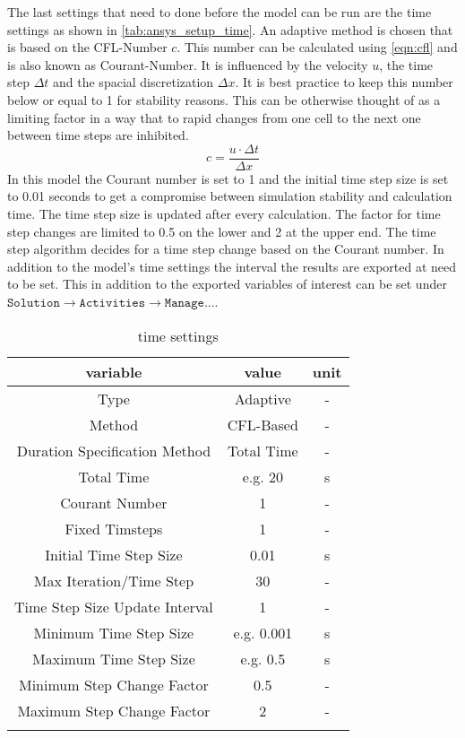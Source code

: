 \documentclass[../thesis.tex]{subfiles}
\begin{document}
The last settings that need to done before the model can be run are the time settings as shown in \autoref{tab:ansys_setup_time}. An adaptive method is chosen that is based on the CFL-Number $c$. This number can be calculated using \autoref{eqn:cfl} and is also known as Courant-Number. It is influenced by the velocity $u$, the time step $ \Delta t$ and the spacial discretization $\Delta x$. It is best practice to keep this number below or equal to 1 for stability reasons. This can be otherwise thought of as a limiting factor in a way that to rapid changes from one cell to the next one between time steps are inhibited.  
\begin{equation}
	\label{eqn:cfl}
	c = \dfrac{u \cdot \Delta t}{\Delta x}
\end{equation}
In this model the Courant number is set to 1 and the initial time step size is set to 0.01 seconds to get a compromise between simulation stability and calculation time. The time step size is updated after every calculation. The factor for time step changes are limited to 0.5 on the lower and 2 at the upper end. The time step algorithm decides for a time step change based on the Courant number. In addition to the model's time settings the interval the results are exported at need to be set. This in addition to the exported variables of interest can be set under $\texttt{Solution} \rightarrow \texttt{Activities} \rightarrow \texttt{Manage...}$.

\begin{table} [htb]
	\centering
	\caption{time settings}
	\begin{tabular}{ ccc }
		\hline
		variable & value & unit \\
		\hline
		Type & Adaptive & - \\
		Method & CFL-Based & - \\
		Duration Specification Method & Total Time & -\\
		Total Time & e.g. 20 & s \\
		Courant Number & 1 & - \\
		Fixed Timsteps & 1 & - \\
		Initial Time Step Size & 0.01 & s \\
		Max Iteration/Time Step & 30 & - \\
		Time Step Size Update Interval & 1 & - \\
		Minimum Time Step Size & e.g. 0.001 & s \\
		Maximum Time Step Size & e.g. 0.5 & s \\
		Minimum Step Change Factor & 0.5 & - \\
		Maximum Step Change Factor & 2 & - \\		
		\hline
		\label{tab:ansys_setup_time}
	\end{tabular}
\end{table}
\end{document}
